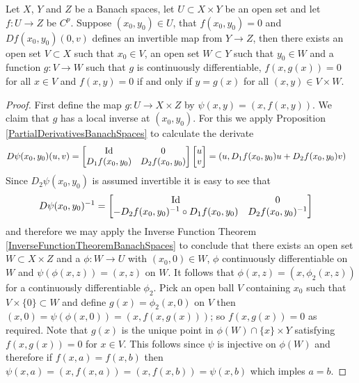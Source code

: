 \begin{thm}\label{ImplicitFunctionTheorem}Let $X$, $Y$ and $Z$ be a Banach
  spaces, let $U \subset X \times Y$ be an open set  and let $f : U
  \to Z$ be $C^p$.  
Suppose $(x_0,y_0) \in U$, that $f(x_0,y_0) = 0$
  and $Df(x_0,y_0)(0,v)$ defines an invertible map from $Y \to Z$, then
  there exists an open set $V \subset X$ such that $x_0 \in V$, an
  open set $W \subset Y$ such that $y_0 \in W$ and a function $g : V \to
  W$ such that $g$ is continuously differentiable, $f(x, g(x)) = 0$
  for all $x \in V$ and $f(x,y) = 0$ if and only if $y = g(x)$ for all
  $(x,y) \in V \times W$.
\end{thm}
\begin{proof}
First define the map $g : U \to X \times Z$ by $\psi(x,y) = (x,
f(x,y))$.  We claim that $g$ has a local inverse at $(x_0,y_0)$.  For this we apply 
Proposition \ref{PartialDerivativesBanachSpaces} to calculate the derivate
\begin{align*}
D\psi(x_0,y_0) (u,v) &= 
\begin{bmatrix}
\operatorname*{Id} & 0 \\
D_1 f(x_0, y_0) & D_2 f(x_0, y_0)
\end{bmatrix} 
\begin{bmatrix} 
u \\
v
\end{bmatrix}
= (u, D_1 f(x_0, y_0) u + D_2f(x_0,y_0) v)
\end{align*}
Since $D_2 \psi (x_0,y_0)$ is assumed invertible it is easy to see that
\begin{align*}
D\psi(x_0,y_0)^{-1} &=
\begin{bmatrix}
\operatorname*{Id} & 0 \\
-D_2 f(x_0, y_0)^{-1}  \circ D_1 f(x_0, y_0) & D_2 f(x_0, y_0)^{-1}
\end{bmatrix} 
\end{align*}
and therefore we may apply the Inverse Function Theorem \ref{InverseFunctionTheoremBanachSpaces}
to conclude that there exists an open set $W \subset X \times Z$ and a $\phi : W \to U$ with $(x_0,0) \in W$, $\phi$ continuously differentiable on $W$ and
$\psi(\phi(x,z)) = (x,z)$ on $W$.  It follows that $\phi(x, z) = (x, \phi_2(x,z))$ for a continuously differentiable $\phi_2$.  Pick an open ball $V$ containing $x_0$ such that $V \times \lbrace 0 \rbrace \subset W$ and define $g(x) = \phi_2(x,0)$ on $V$ then
$(x,0) = \psi(\phi(x,0)) = (x, f(x, g(x)))$; so $f(x, g(x)) = 0$ as required.  Note that $g(x)$ is the unique point in $\phi(W) \cap \lbrace x \rbrace \times Y$ satisfying $f(x, g(x)) = 0$ for $ x \in V$.   This follows since $\psi$ is injective on $\phi(W)$ and therefore if $f(x, a) = f(x, b)$ then $\psi(x,a) = (x, f(x,a)) = (x, f(x,b)) = \psi(x, b)$ which imples $a=b$.
\end{proof}

